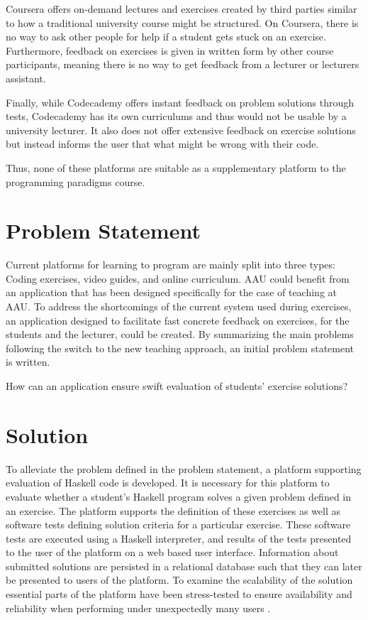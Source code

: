 Coursera offers on-demand lectures and exercises created by third parties similar to how a traditional university course might be structured.
On Coursera, there is no way to ask other people for help if a student gets stuck on an exercise.
Furthermore, feedback on exercises is given in written form by other course participants, meaning there is no way to get feedback from a lecturer or lecturers assistant.


Finally, while Codecademy offers instant feedback on problem solutions through tests, Codecademy has its own curriculums and thus would not be usable by a university lecturer.
It also does not offer extensive feedback on exercise solutions but instead informs the user that what might be wrong with their code.


Thus, none of these platforms are suitable as a supplementary platform to the programming paradigms course.
\section{Problem Statement}
Current platforms for learning to program are mainly split into three types: Coding exercises, video guides, and online curriculum.
AAU could benefit from an application that has been designed specifically for the case of teaching at AAU.
To address the shortcomings of the current system used during exercises, an application designed to facilitate fast concrete feedback on exercises, for the students and the lecturer, could be created.
By summarizing the main problems following the switch to the new teaching approach, an initial problem statement is written.
\begin{displayquote}
    How can an application ensure swift evaluation of students' exercise solutions?
\end{displayquote}

\section{Solution}
To alleviate the problem defined in the problem statement, a platform supporting evaluation of Haskell code is developed. It is necessary for this platform to evaluate whether a student's Haskell program solves a given problem defined in an exercise. The platform supports the definition of these exercises as well as software tests defining solution criteria for a particular exercise. These software tests are executed using a Haskell interpreter, and results of the tests presented to the user of the platform on a web based user interface.
Information about submitted solutions are persisted in a relational database such that they can later be presented to users of the platform.
To examine the scalability of the solution essential parts of the platform have been stress-tested to ensure availability and reliability when performing under unexpectedly many users \cite{Sommerville10}.


